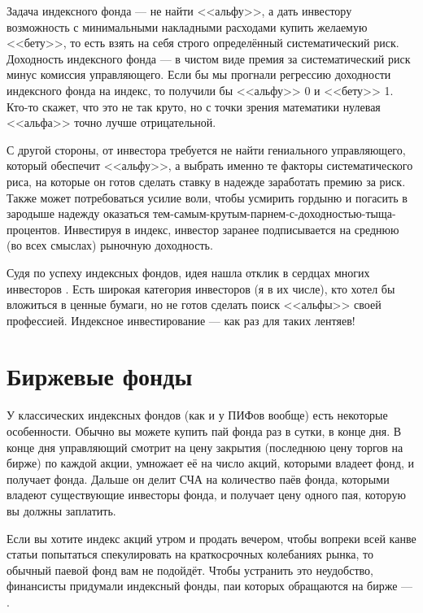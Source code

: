 Задача индексного фонда --- не найти <<альфу>>, а дать инвестору возможность с минимальными накладными расходами купить желаемую <<бету>>, то есть взять на себя строго определённый систематический риск. Доходность индексного фонда --- в чистом виде премия за систематический риск минус комиссия управляющего. Если бы мы прогнали регрессию доходности индексного фонда на индекс, то получили бы <<альфу>> 0 и <<бету>> 1. Кто-то скажет, что это не так круто, но с точки зрения математики нулевая <<альфа>> точно лучше отрицательной.

С другой стороны, от инвестора требуется не найти гениального управляющего, который обеспечит <<альфу>>, а выбрать именно те факторы систематического риса, на которые он готов сделать ставку в надежде заработать премию за риск. Также может потребоваться усилие воли, чтобы усмирить гордыню и погасить в зародыше надежду оказаться тем-самым-крутым-парнем-с-доходностью-тыща-процентов. Инвестируя в индекс, инвестор заранее подписывается на среднюю (во всех смыслах) рыночную доходность.

Судя по успеху индексных фондов, идея нашла отклик в сердцах многих инвесторов \cite{bogle2016index}. Есть широкая категория инвесторов (я в их числе), кто хотел бы вложиться в ценные бумаги, но не готов сделать поиск <<альфы>> своей профессией. Индексное инвестирование --- как раз для таких лентяев!

\section{Биржевые фонды}

У классических индексных фондов (как и у ПИФов вообще) есть некоторые особенности. Обычно вы можете купить пай фонда раз в сутки, в конце дня. В конце дня управляющий смотрит на цену закрытия (последнюю цену торгов на бирже) по каждой акции, умножает её на число акций, которыми владеет фонд, и получает  фонда. Дальше он делит СЧА на количество паёв фонда, которыми владеют существующие инвесторы фонда, и получает цену одного пая, которую вы должны заплатить.

Если вы хотите индекс акций утром и продать вечером, чтобы вопреки всей канве статьи попытаться спекулировать на краткосрочных колебаниях рынка, то обычный паевой фонд вам не подойдёт. Чтобы устранить это неудобство, финансисты придумали индексный фонды, паи которых обращаются на бирже --- .

